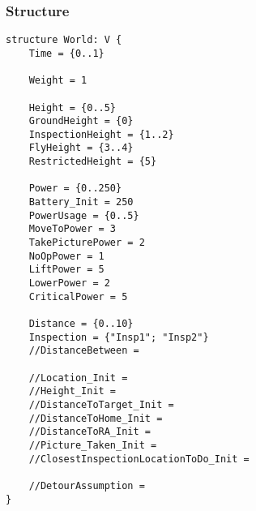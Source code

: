 \documentclass[12pt]{extarticle}
\begin{document}
\subsubsection*{Structure}
\begin{lstlisting}[basicstyle=\tiny]
structure World: V {
    Time = {0..1}
    
    Weight = 1
    
    Height = {0..5}
    GroundHeight = {0}
    InspectionHeight = {1..2}
    FlyHeight = {3..4}
    RestrictedHeight = {5}
    
    Power = {0..250}
    Battery_Init = 250
    PowerUsage = {0..5}
    MoveToPower = 3
    TakePicturePower = 2
    NoOpPower = 1
    LiftPower = 5
    LowerPower = 2
    CriticalPower = 5
    
    Distance = {0..10}
    Inspection = {"Insp1"; "Insp2"}
    //DistanceBetween =

    //Location_Init =
    //Height_Init = 
    //DistanceToTarget_Init =
    //DistanceToHome_Init =
    //DistanceToRA_Init =
    //Picture_Taken_Init =
    //ClosestInspectionLocationToDo_Init =
    
    //DetourAssumption =
}
\end{lstlisting}
\vspace{2mm}
\end{document}
